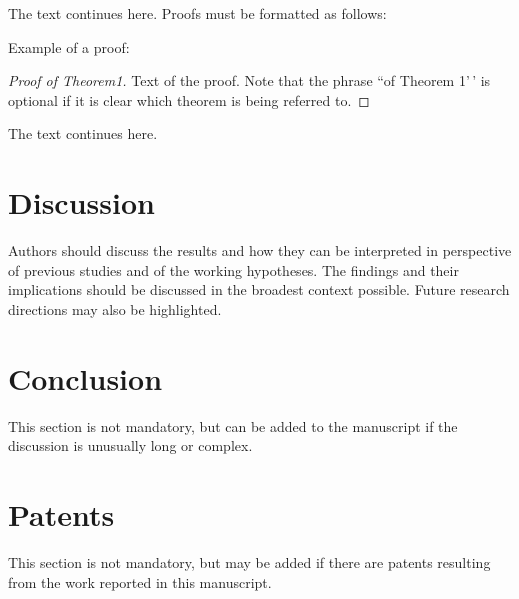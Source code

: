 \documentclass[notspecified,article,submit,moreauthors,pdftex]{Definitions/mdpi}
\begin{document}
The text continues here. Proofs must be formatted as follows:

Example of a proof:

\begin{proof}[Proof of Theorem1]
Text of the proof. Note that the phrase ``of Theorem 1'\,' is optional
if it is clear which theorem is being referred to.

\end{proof}

The text continues here.

\hypertarget{discussion}{%
\section{Discussion}\label{discussion}}

Authors should discuss the results and how they can be interpreted in
perspective of previous studies and of the working hypotheses. The
findings and their implications should be discussed in the broadest
context possible. Future research directions may also be highlighted.

\hypertarget{conclusion}{%
\section{Conclusion}\label{conclusion}}

This section is not mandatory, but can be added to the manuscript if the
discussion is unusually long or complex.

\hypertarget{patents}{%
\section{Patents}\label{patents}}

This section is not mandatory, but may be added if there are patents
resulting from the work reported in this manuscript.


\vspace{6pt}


\end{document}

